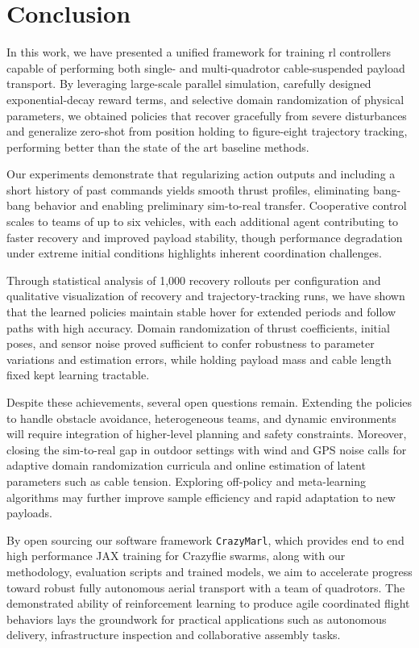 \chapter{Conclusion}

In this work, we have presented a unified framework for training \gls{rl} controllers capable of performing both single- and multi-quadrotor cable-suspended payload transport. By leveraging large-scale parallel simulation, carefully designed exponential-decay reward terms, and selective domain randomization of physical parameters, we obtained policies that recover gracefully from severe disturbances and generalize zero-shot from position holding to figure-eight trajectory tracking, performing better than the state of the art baseline methods.

Our experiments demonstrate that regularizing action outputs and including a short history of past commands yields smooth thrust profiles, eliminating bang-bang behavior and enabling preliminary sim-to-real transfer. Cooperative control scales to teams of up to six vehicles, with each additional agent contributing to faster recovery and improved payload stability, though performance degradation under extreme initial conditions highlights inherent coordination challenges.

Through statistical analysis of 1,000 recovery rollouts per configuration and qualitative visualization of recovery and trajectory-tracking runs, we have shown that the learned policies maintain stable hover for extended periods and follow paths with high accuracy. Domain randomization of thrust coefficients, initial poses, and sensor noise proved sufficient to confer robustness to parameter variations and estimation errors, while holding payload mass and cable length fixed kept learning tractable.

Despite these achievements, several open questions remain. Extending the policies to handle obstacle avoidance, heterogeneous teams, and dynamic environments will require integration of higher-level planning and safety constraints. Moreover, closing the sim-to-real gap in outdoor settings with wind and GPS noise calls for adaptive domain randomization curricula and online estimation of latent parameters such as cable tension. Exploring off-policy and meta-learning algorithms may further improve sample efficiency and rapid adaptation to new payloads.

By open sourcing our software framework \texttt{CrazyMarl}, which provides end to end high performance JAX training for Crazyflie swarms, along with our methodology, evaluation scripts and trained models, we aim to accelerate progress toward robust fully autonomous aerial transport with a team of quadrotors. The demonstrated ability of reinforcement learning to produce agile coordinated flight behaviors lays the groundwork for practical applications such as autonomous delivery, infrastructure inspection and collaborative assembly tasks.